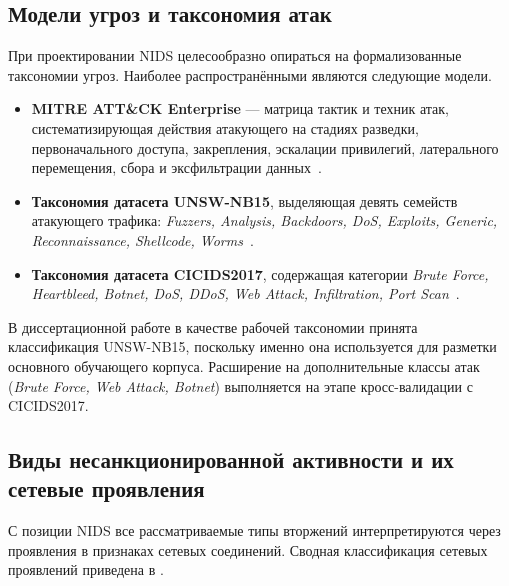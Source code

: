 \subsection{Модели угроз и таксономия атак}

При проектировании NIDS целесообразно опираться на формализованные таксономии угроз.
Наиболее распространёнными являются следующие модели.

\begin{itemize}
    \item \textbf{MITRE ATT\&CK Enterprise} --- матрица тактик и техник атак,
    систематизирующая действия атакующего на стадиях разведки, первоначального
    доступа, закрепления, эскалации привилегий, латерального перемещения,
    сбора и эксфильтрации данных~\cite{mitreattack}.
    \item \textbf{Таксономия датасета UNSW-NB15}, выделяющая девять семейств
    атакующего трафика: \emph{Fuzzers, Analysis, Backdoors, DoS, Exploits, Generic,
    Reconnaissance, Shellcode, Worms}~\cite{moustafa2015unsw}.
    \item \textbf{Таксономия датасета CICIDS2017}, содержащая категории
    \emph{Brute Force, Heartbleed, Botnet, DoS, DDoS, Web Attack, Infiltration,
    Port Scan}~\cite{sharafaldin2018toward}.
\end{itemize}

В диссертационной работе в качестве рабочей таксономии принята классификация
UNSW-NB15, поскольку именно она используется для разметки основного обучающего
корпуса. Расширение на дополнительные классы атак (\textit{Brute Force, Web
Attack, Botnet}) выполняется на этапе кросс-валидации с CICIDS2017.

\subsection{Виды несанкционированной активности и их сетевые проявления}

С позиции NIDS все рассматриваемые типы вторжений интерпретируются через
проявления в признаках сетевых соединений. Сводная классификация
сетевых проявлений приведена в .

